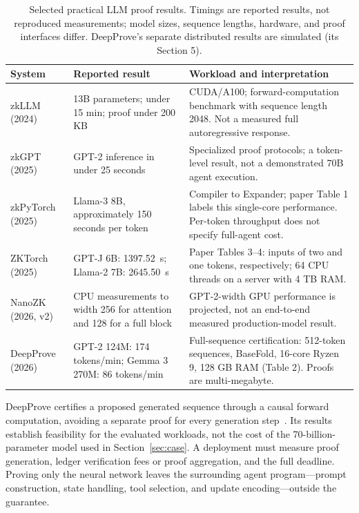 \documentclass[10pt,letterpaper]{article}
\begin{document}
\begin{table}[!htbp]
\centering\small
\setlength{\tabcolsep}{4pt}
\begin{tabularx}{\textwidth}{@{}>{\raggedright\arraybackslash}p{2.0cm}>{\raggedright\arraybackslash}p{3.1cm}>{\raggedright\arraybackslash}X@{}}
\toprule
System & Reported result & Workload and interpretation\\
\midrule
zkLLM (2024)~\citep{zkllm2024} & 13B parameters; under 15 min; proof under 200 KB & CUDA/A100; forward-computation benchmark with sequence length 2048. Not a measured full autoregressive response.\\[3pt]
zkGPT (2025)~\citep{zkgpt2025} & GPT-2 inference in under 25 seconds & Specialized proof protocols; a token-level result, not a demonstrated 70B agent execution.\\[3pt]
zkPyTorch (2025)~\citep{zkpytorch2025} & Llama-3 8B, approximately 150 seconds per token & Compiler to Expander; paper Table 1 labels this single-core performance. Per-token throughput does not specify full-agent cost.\\[3pt]
ZKTorch (2025)~\citep{zktorch2025} & GPT-J 6B: 1397.52~s; Llama-2 7B: 2645.50~s & Paper Tables 3--4: inputs of two and one tokens, respectively; 64 CPU threads on a server with 4 TB RAM.\\[3pt]
NanoZK (2026, v2)~\citep{nanozk2026} & CPU measurements to width 256 for attention and 128 for a full block & GPT-2-width GPU performance is projected, not an end-to-end measured production-model result.\\[3pt]
DeepProve (2026)~\citep{deepprove2026} & GPT-2 124M: 174 tokens/min; Gemma 3 270M: 86 tokens/min & Full-sequence certification: 512-token sequences, BaseFold, 16-core Ryzen 9, 128 GB RAM (Table 2). Proofs are multi-megabyte.\\
\bottomrule
\end{tabularx}
\caption{Selected practical LLM proof results. Timings are reported results, not reproduced measurements; model sizes, sequence lengths, hardware, and proof interfaces differ. DeepProve's separate distributed results are simulated (its Section 5).}
\label{tab:zk}
\end{table}

DeepProve certifies a proposed generated sequence through a causal forward computation, avoiding a separate proof for every generation step~\citep{deepprove2026}. Its results establish feasibility for the evaluated workloads, not the cost of the 70-billion-parameter model used in Section~\ref{sec:case}. A deployment must measure proof generation, ledger verification fees or proof aggregation, and the full deadline. Proving only the neural network leaves the surrounding agent program---prompt construction, state handling, tool selection, and update encoding---outside the guarantee.
\end{document}
